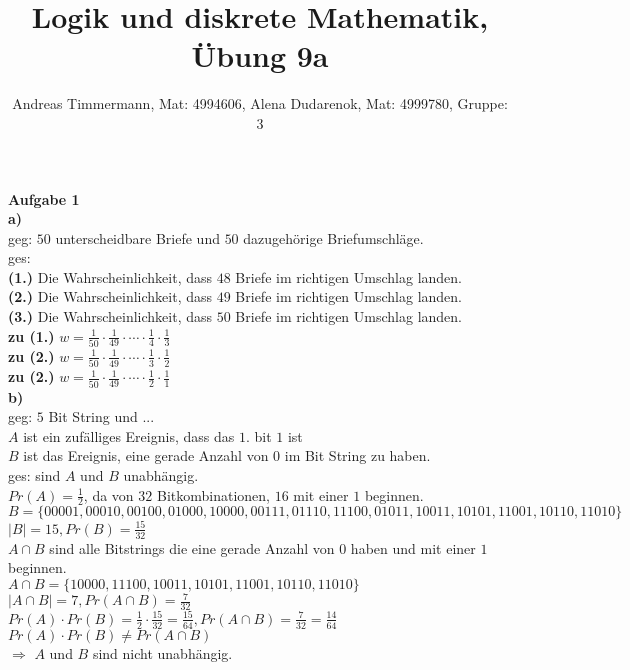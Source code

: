 \documentclass[a4paper]{scrartcl}
\title{Logik und diskrete Mathematik, Übung 9a}
\author{Andreas Timmermann, Mat: 4994606, Alena Dudarenok, Mat: 4999780, Gruppe: 3}
\begin{document}
	\maketitle
	\begin{flushleft}
		\textbf{Aufgabe 1}\\
		\textbf{a)} \\
		geg: $50$ unterscheidbare Briefe und $50$ dazugehörige Briefumschläge.\\
		ges: \\
		\textbf{(1.)} Die Wahrscheinlichkeit, dass $48$ Briefe im richtigen Umschlag landen.\\ 
		\textbf{(2.)} Die Wahrscheinlichkeit, dass $49$ Briefe im richtigen Umschlag landen.\\ 
		\textbf{(3.)} Die Wahrscheinlichkeit, dass $50$ Briefe im richtigen Umschlag landen.\\[1em]
		
		\textbf{zu (1.)} $w=\frac{1}{50}\cdot\frac{1}{49}\cdot\cdots\cdot\frac{1}{4}\cdot\frac{1}{3}$\\
		\textbf{zu (2.)} $w=\frac{1}{50}\cdot\frac{1}{49}\cdot\cdots\cdot\frac{1}{3}\cdot\frac{1}{2}$\\
		\textbf{zu (2.)} $w=\frac{1}{50}\cdot\frac{1}{49}\cdot\cdots\cdot\frac{1}{2}\cdot\frac{1}{1}$\\[1em]

		\textbf{b)} \\
		geg: $5$ Bit String und ...\\
		$A$ ist ein zufälliges Ereignis, dass das $1.$ bit $1$ ist\\
		$B$ ist das Ereignis, eine gerade Anzahl von $0$ im Bit String zu haben.\\[1em]
		ges: sind $A$ und $B$ unabhängig.\\
		$Pr(A)=\frac{1}{2}$, da von $32$ Bitkombinationen, $16$ mit einer $1$ beginnen.\\
		$B=\{00001,00010,00100,01000,10000,00111,01110,11100,01011,10011,10101,11001,10110,11010\}$\\
		$|B| = 15, Pr(B)=\frac{15}{32}$\\
		$A\cap B$ sind alle Bitstrings die eine gerade Anzahl von $0$ haben und mit einer $1$ beginnen.\\
		$A\cap B=\{10000,11100,10011,10101,11001,10110,11010\}$\\
		$|A\cap B|=7, Pr(A\cap B)=\frac{7}{32}$\\[1em]
		$Pr(A)\cdot Pr(B)=\frac{1}{2}\cdot \frac{15}{32}=\frac{15}{64}, Pr(A\cap B) = \frac{7}{32} = \frac{14}{64}$\\
		$Pr(A)\cdot Pr(B)\neq Pr(A\cap B)$\\[1em]
		$\Rightarrow$ $A$ und $B$ sind nicht unabhängig.\\[1em]
	\end{flushleft}
\end{document}
